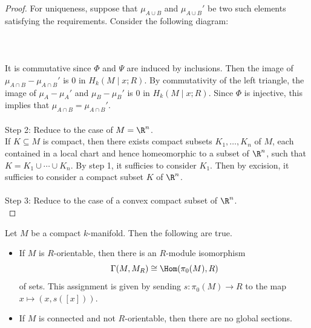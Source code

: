 \documentclass[a4paper]{article}
\begin{document}
\begin{prp}{}{}
\begin{proof}
For uniqueness, suppose that $\mu_{A\cup B}$ and $\mu_{A\cup B}'$ be two such elements satisfying the requirements. Consider the following diagram: \\~\\
\\~\\
It is commutative since $\Phi$ and $\Psi$ are induced by inclusions. Then the image of $\mu_{A\cap B}-\mu_{A\cap B}'$ is $0$ in $H_k(M\;|\;x;R)$. By commutativity of the left triangle, the image of $\mu_A-\mu_A'$ and $\mu_B-\mu_B'$ is $0$ in $H_k(M\;|\;x;R)$. Since $\Phi$ is injective, this implies that $\mu_{A\cap B}=\mu_{A\cap B}'$. \\~\\

Step 2: Reduce to the case of $M=\R^n$. \\
If $K\subseteq M$ is compact, then there exists compact subsets $K_1,\dots,K_n$ of $M$, each contained in a local chart and hence homeomorphic to a subset of $\R^n$, such that $K=K_1\cup\cdots\cup K_n$. By step 1, it sufficies to consider $K_1$. Then by excision, it sufficies to consider a compact subset $K$ of $\R^n$. \\~\\

Step 3: Reduce to the case of a convex compact subset of $\R^n$. \\
\end{proof}
\end{prp}

\begin{prp}{}{} Let $M$ be a compact $k$-manifold. Then the following are true. 
\begin{itemize}
\item If $M$ is $R$-orientable, then there is an $R$-module isomorphism $$\Gamma(M,M_R)\cong\Hom(\pi_0(M),R)$$ of sets. This assignment is given by sending $s:\pi_0(M)\to R$ to the map $x\mapsto(x,s([x]))$. 
\item If $M$ is connected and not $R$-orientable, then there are no global sections. 
\end{itemize}
\end{prp}
\end{document}
